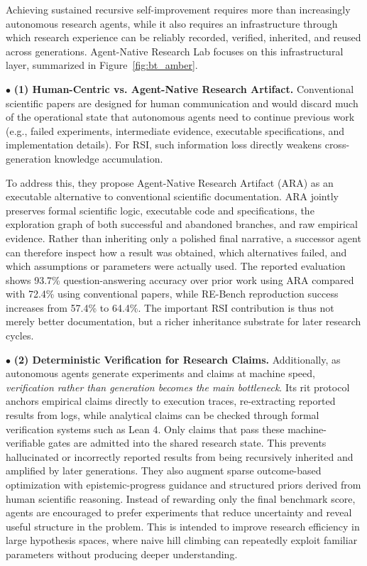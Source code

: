 Achieving sustained recursive self-improvement requires more than increasingly autonomous research agents, while it also requires an infrastructure through which research experience can be reliably recorded, verified, inherited, and reused across generations. Agent-Native Research Lab focuses on this infrastructural layer, summarized in Figure~\ref{fig:bt_amber}. 

$\bullet$ \textbf{(1) Human-Centric vs. Agent-Native Research Artifact.} Conventional scientific papers are designed for human communication and would discard much of the operational state that autonomous agents need to continue previous work (e.g., failed experiments, intermediate evidence, executable specifications, and implementation details). For RSI, such information loss directly weakens cross-generation knowledge accumulation.

To address this, they propose Agent-Native Research Artifact (ARA) as an executable alternative to conventional scientific documentation. ARA jointly preserves formal scientific logic, executable code and specifications, the exploration graph of both successful and abandoned branches, and raw empirical evidence. Rather than inheriting only a polished final narrative, a successor agent can therefore inspect how a result was obtained, which alternatives failed, and which assumptions or parameters were actually used. The reported evaluation shows 93.7\% question-answering accuracy over prior work using ARA compared with 72.4\% using conventional papers, while RE-Bench reproduction success increases from 57.4\% to 64.4\%. The important RSI contribution is thus not merely better documentation, but a richer inheritance substrate for later research cycles.

$\bullet$ \textbf{(2) Deterministic Verification for Research Claims.} Additionally, as autonomous agents generate experiments and claims at machine speed, \textit{verification rather than generation becomes the main bottleneck}. Its rit protocol anchors empirical claims directly to execution traces, re-extracting reported results from logs, while analytical claims can be checked through formal verification systems such as Lean 4. Only claims that pass these machine-verifiable gates are admitted into the shared research state. This prevents hallucinated or incorrectly reported results from being recursively inherited and amplified by later generations. They also augment sparse outcome-based optimization with epistemic-progress guidance and structured priors derived from human scientific reasoning. Instead of rewarding only the final benchmark score, agents are encouraged to prefer experiments that reduce uncertainty and reveal useful structure in the problem. This is intended to improve research efficiency in large hypothesis spaces, where naive hill climbing can repeatedly exploit familiar parameters without producing deeper understanding.

